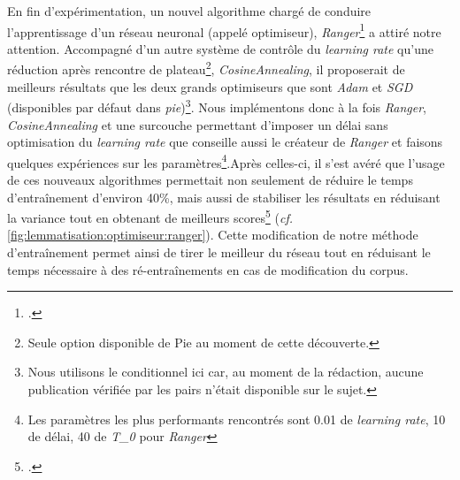 En fin d'expérimentation, un nouvel algorithme chargé de conduire l'apprentissage d'un réseau neuronal (appelé optimiseur), \textit{Ranger}\footcite{wright_new_2019} a attiré notre attention. Accompagné d'un autre système de contrôle du \textit{learning rate} qu'une réduction après rencontre de plateau\footnote{Seule option disponible de Pie au moment de cette découverte.}, \textit{CosineAnnealing}, il proposerait de meilleurs résultats que les deux grands optimiseurs que sont \textit{Adam} et \textit{SGD} (disponibles par défaut dans \textit{pie})\footnote{Nous utilisons le conditionnel ici car, au moment de la rédaction, aucune publication vérifiée par les pairs n'était disponible sur le sujet.}. Nous implémentons donc à la fois \textit{Ranger}, \textit{CosineAnnealing} et une surcouche permettant d'imposer un délai sans optimisation du \textit{learning rate} que conseille aussi le créateur de \textit{Ranger} et faisons quelques expériences sur les paramètres\footnote{Les paramètres les plus performants rencontrés sont 0.01 de \textit{learning rate}, 10 de délai, 40 de \textit{T\_0} pour \textit{Ranger}}.Après celles-ci, il s'est avéré que l'usage de ces nouveaux algorithmes permettait non seulement de réduire le temps d'entraînement d'environ 40\%, mais aussi de stabiliser les résultats en réduisant la variance tout en obtenant de meilleurs scores\footcite{clerice_allow_nodate} (\textit{cf.} \ref{fig:lemmatisation:optimiseur:ranger}). Cette modification de notre méthode d'entraînement permet ainsi de tirer le meilleur du réseau tout en réduisant le temps nécessaire à des ré-entraînements en cas de modification du corpus.


